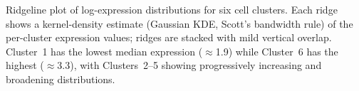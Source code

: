 \caption{Ridgeline plot of log-expression distributions for six cell clusters. Each ridge shows a kernel-density estimate (Gaussian KDE, Scott's bandwidth rule) of the per-cluster expression values; ridges are stacked with mild vertical overlap. Cluster~1 has the lowest median expression ($\approx$1.9) while Cluster~6 has the highest ($\approx$3.3), with Clusters~2--5 showing progressively increasing and broadening distributions.}
